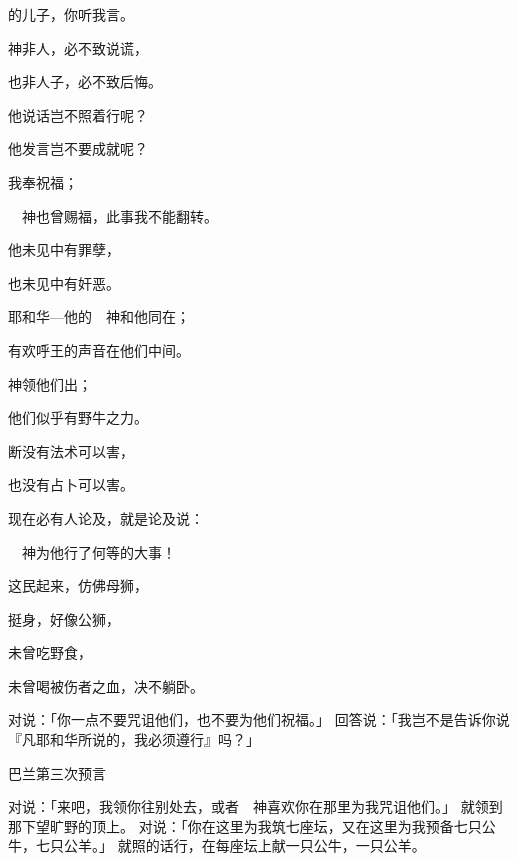 {\par }{的儿子，你听我言。
\par }{\Q {}神非人，必不致说谎，
\par }{\Q 也非人子，必不致后悔。
\par }{\Q 他说话岂不照着行呢？
\par }{\Q 他发言岂不要成就呢？
\par }{\Q {}我奉{}祝福；
\par }{\Q 　神也曾赐福，此事我不能翻转。
\par }{\Q {}他未见{}中有罪孽，
\par }{\Q 也未见{}中有奸恶。
\par }{\Q 耶和华—他的　神和他同在；
\par }{\Q 有欢呼王的声音在他们中间。
\par }{\Q {}神领他们出{}；
\par }{\Q 他们似乎有野牛之力。
\par }{\Q {}断没有法术可以害{}，
\par }{\Q 也没有占卜可以害{}。
\par }{\Q 现在必有人论及{}，就是论及{}说：
\par }{\Q 　神为他行了何等的大事！
\par }{\Q {}这民起来，仿佛母狮，
\par }{\Q 挺身，好像公狮，
\par }{\Q 未曾吃野食，
\par }{\Q 未曾喝被伤者之血，决不躺卧。
\par }{\PP {}对{}说：「你一点不要咒诅他们，也不要为他们祝福。」
回答{}说：「我岂不是告诉你说『凡耶和华所说的，我必须遵行』吗？」
\par }{\SH 巴兰第三次预言
\par }{\PP {}对{}说：「来吧，我领你往别处去，或者　神喜欢你在那里为我咒诅他们。」
就领{}到那下望旷野的{}{}顶上。
对{}说：「你在这里为我筑七座坛，又在这里为我预备七只公牛，七只公羊。」
就照{}的话行，在每座坛上献一只公牛，一只公羊。

}
